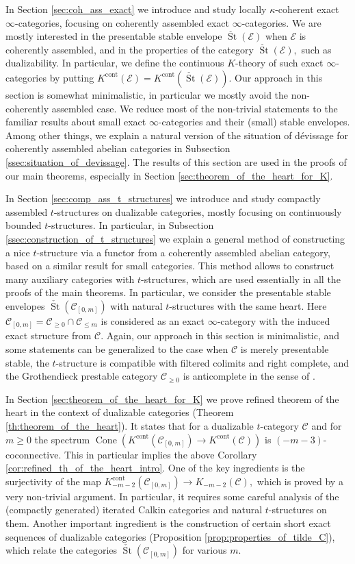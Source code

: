 \documentclass[11pt,leqno]{amsart}
\numberwithin{equation}{section}
\newcommand{\Cone}{\operatorname{Cone}}
\newcommand{\cont}{\operatorname{cont}}
\newcommand{\St}{\operatorname{St}}
\newcommand{\cC}{{\mathcal C}}
\newcommand{\cE}{{\mathcal E}}
\begin{document}
In Section \ref{sec:coh_ass_exact} we introduce and study locally $\kappa$-coherent exact $\infty$-categories, focusing on coherently assembled exact $\infty$-categories. We are mostly interested in the presentable stable envelope $\check{\St}(\cE)$ when $\cE$ is coherently assembled, and in the properties of the category $\check{\St}(\cE),$ such as dualizability. In particular, we define the continuous $K$-theory of such exact $\infty$-categories by putting $K^{\cont}(\cE)=K^{\cont}(\check{\St}(\cE)).$ Our approach in this section is somewhat minimalistic, in particular we mostly avoid the non-coherently assembled case. We reduce most of the non-trivial statements to the familiar results about small exact $\infty$-categories and their (small) stable envelopes. Among other things, we explain a natural version of the situation of d\'evissage for coherently assembled abelian categories in Subsection \ref{ssec:situation_of_devissage}. The results of this section are used in the proofs of our main theorems, especially in Section \ref{sec:theorem_of_the_heart_for_K}. 

In Section \ref{sec:comp_ass_t_structures} we introduce and study compactly assembled $t$-structures on dualizable categories, mostly focusing on continuously bounded $t$-structures. In particular, in Subsection \ref{ssec:construction_of_t_structures} we explain a general method of constructing a nice $t$-structure via a functor from a coherently assembled abelian category, based on a similar result for small categories. This method allows to construct many auxiliary categories with $t$-structures, which are used essentially in all the proofs of the main theorems. In particular, we consider the presentable stable envelopes $\check{\St}(\cC_{[0,m]})$ with natural $t$-structures with the same heart. Here $\cC_{[0,m]}=\cC_{\geq 0}\cap\cC_{\leq m}$ is considered as an exact $\infty$-category with the induced exact structure from $\cC.$ Again, our approach in this section is minimalistic, and some statements can be generalized to the case when $\cC$ is merely presentable stable, the $t$-structure is compatible with filtered colimits and right complete, and the Grothendieck prestable category $\cC_{\geq 0}$ is anticomplete in the sense of \cite[Definition C.5.5.4]{Lur18}. 

In Section \ref{sec:theorem_of_the_heart_for_K} we prove refined theorem of the heart in the context of dualizable categories (Theorem \ref{th:theorem_of_the_heart}). It states that for a dualizable $t$-category $\cC$ and for $m\geq 0$ the spectrum $\Cone(K^{\cont}(\cC_{[0,m]})\to K^{\cont}(\cC))$ is $(-m-3)$-coconnective. This in particular implies the above Corollary \ref{cor:refined_th_of_the_heart_intro}. One of the key ingredients is the surjectivity of the map $K_{-m-2}^{\cont}(\cC_{[0,m]})\to K_{-m-2}(\cC),$ which is proved by a very non-trivial argument. In particular, it requires some careful analysis of the (compactly generated) iterated Calkin categories and natural $t$-structures on them. Another important ingredient is the construction of certain short exact sequences of dualizable categories (Proposition \ref{prop:properties_of_tilde_C}), which relate the categories $\check{\St}(\cC_{[0,m]})$ for various $m.$
\end{document}
